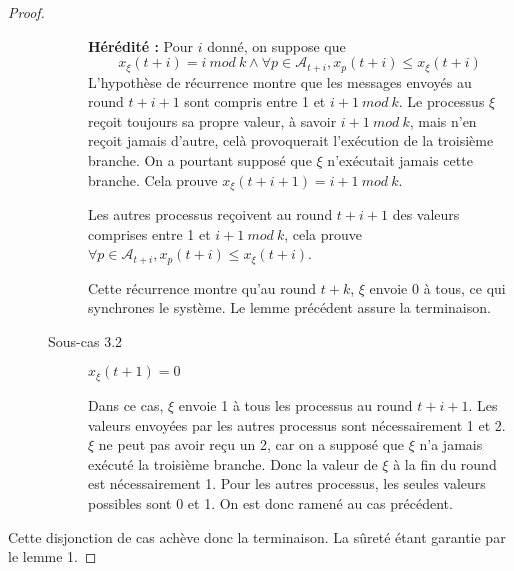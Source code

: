 \documentclass{article}
\begin{document}
\begin{proof}
\begin{description}
\begin{description}
					\textbf{Hérédité : } Pour $i$ donné, on suppose que 
					$$x_\xi(t+i) = i~mod~k \wedge \forall p \in \mathcal{A}_{t+i}, x_p(t+i) \leq x_\xi(t+i)$$
					L'hypothèse de récurrence montre que les messages envoyés au round $t+i+1$ sont compris entre 1 et $i+1~mod~k$.
					Le processus $\xi$ reçoit toujours sa propre valeur, à savoir $i+1~mod~k$, mais n'en reçoit jamais d'autre, celà provoquerait l'exécution de la troisième branche.
					On a pourtant supposé que $\xi$ n'exécutait jamais cette branche. Cela prouve $x_\xi(t+i+1) = i+1~mod~k$.

					Les autres processus reçoivent au round $t+i+1$ des valeurs comprises entre 1 et $i+1~mod~k$, cela prouve $\forall p \in \mathcal{A}_{t+i}, x_p(t+i) \leq x_\xi(t+i)$.

					Cette récurrence montre qu'au round $t+k$, $\xi$ envoie 0 à tous, ce qui synchrones le système. Le lemme précédent assure la terminaison.

				\item[Sous-cas 3.2] $x_\xi(t+1) = 0$

					Dans ce cas, $\xi$ envoie 1 à tous les processus au round $t+i+1$. Les valeurs envoyées par les autres processus sont nécessairement 1 et 2.
					$\xi$ ne peut pas avoir reçu un 2, car on a supposé que $\xi$ n'a jamais exécuté la troisième branche. Donc la valeur de $\xi$ à la fin du round est nécessairement 1.
					Pour les autres processus, les seules valeurs possibles sont 0 et 1. On est donc ramené au cas précédent.
			\end{description}
	\end{description}

	Cette disjonction de cas achève donc la terminaison. La sûreté étant garantie par le lemme 1.
\end{proof}
\end{document}
